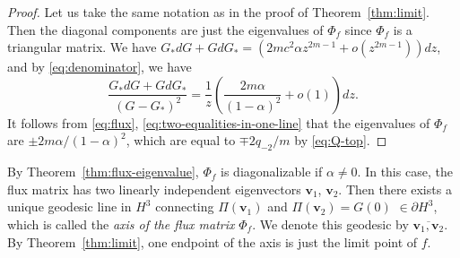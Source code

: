 \documentclass[a4paper]{amsart}
\theoremstyle{plain}
\theoremstyle{remark}
\numberwithin{equation}{section}
\begin{document}
\begin{proof}
 Let us take the same notation as in the proof of 
 Theorem~\ref{thm:limit}. 
 Then
 the diagonal components are just the eigenvalues of $\Phi_f$  
 since $\Phi_f$ is a triangular matrix.  
 We have 
 $G_* dG + G dG_* = 
  \left(2mc^2\alpha z^{2m-1}+o(z^{2m-1})\right)dz$,
 and by \eqref{eq:denominator}, we have
 \[
     \frac{G_*dG+GdG_*}{(G-G_*)^2}=
     \frac{1}{z}\left( 
          \frac{2m\alpha}{(1-\alpha)^2}+o(1)
        \right)dz. 
 \]
 It follows from \eqref{eq:flux}, 
 \eqref{eq:two-equalities-in-one-line} that
 the eigenvalues of $\Phi_f$ are $\pm {2m\alpha}/{(1-\alpha)^2}$, 
 which are equal to $\mp 2q_{-2}/{m}$ by \eqref{eq:Q-top}.
\end{proof}

By Theorem~\ref{thm:flux-eigenvalue},
$\Phi_f$ is diagonalizable if $\alpha\ne 0$.
In this case,
the flux matrix has two linearly independent
eigenvectors ${\boldsymbol{{v}}}_1$, ${\boldsymbol{{v}}}_2$.
Then there exists a unique geodesic line in $H^3$ connecting
$\Pi({\boldsymbol{{v}}}_1)$ and $\Pi({\boldsymbol{{v}}}_2)=G(0)$ $\in \partial H^3$,
which is called the {\it axis of the flux matrix\/} $\Phi_f$. 
We denote this geodesic by $\overline{{\boldsymbol{{v}}}_1,{\boldsymbol{{v}}}_2}$.
By Theorem~\ref{thm:limit}, one endpoint of the axis is 
just the limit point of $f$.
\end{document}
